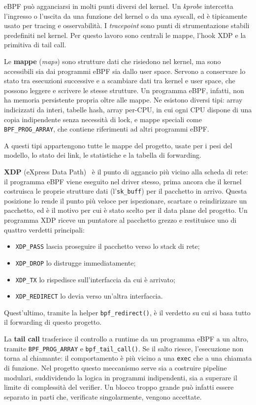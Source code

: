 \documentclass[binding=0.6cm,italian,oneside,noexaminfo]{sapthesis}
\begin{document}
eBPF può agganciarsi in molti punti diversi del kernel. Un \emph{kprobe} intercetta l'ingresso o l'uscita da una funzione del kernel o da una syscall, ed è tipicamente usato per tracing e osservabilità. I \emph{tracepoint} sono punti di strumentazione stabili predefiniti nel kernel. Per questo lavoro sono centrali le mappe, l'hook XDP e la primitiva di tail call.

Le \textbf{mappe} (\emph{maps}) sono strutture dati che risiedono nel kernel, ma sono accessibili sia dai programmi eBPF sia dallo user space. Servono a conservare lo stato tra esecuzioni successive e a scambiare dati tra kernel e user space, che possono leggere e scrivere le stesse strutture. Un programma eBPF, infatti, non ha memoria persistente propria oltre alle mappe. Ne esistono diversi tipi: array indicizzati da interi, tabelle hash, array per-CPU, in cui ogni CPU dispone di una copia indipendente senza necessità di lock, e mappe speciali come \texttt{BPF\_PROG\_ARRAY}, che contiene riferimenti ad altri programmi eBPF.

A questi tipi appartengono tutte le mappe del progetto, usate per i pesi del modello, lo stato dei link, le statistiche e la tabella di forwarding.

\textbf{XDP} (eXpress Data Path)~\cite{xdp2018} è il punto di aggancio più vicino alla scheda di rete: il programma eBPF viene eseguito nel driver stesso, prima ancora che il kernel costruisca le proprie strutture dati (l'\texttt{sk\_buff}) per il pacchetto in arrivo. Questa posizione lo rende il punto più veloce per ispezionare, scartare o reindirizzare un pacchetto, ed è il motivo per cui è stato scelto per il data plane del progetto. Un programma XDP riceve un puntatore al pacchetto grezzo e restituisce uno di quattro verdetti principali:
\begin{itemize}
    \item \texttt{XDP\_PASS} lascia proseguire il pacchetto verso lo stack di rete;
    \item \texttt{XDP\_DROP} lo distrugge immediatamente;
    \item \texttt{XDP\_TX} lo rispedisce sull'interfaccia da cui è arrivato;
    \item \texttt{XDP\_REDIRECT} lo devia verso un'altra interfaccia.
\end{itemize}

Quest'ultimo, tramite la helper \texttt{bpf\_redirect()}, è il verdetto su cui si basa tutto il forwarding di questo progetto.

La \textbf{tail call} trasferisce il controllo a runtime da un programma eBPF a un altro, tramite \texttt{BPF\_PROG\_ARRAY} e \texttt{bpf\_tail\_call()}. Se il salto riesce, l'esecuzione non torna al chiamante: il comportamento è più vicino a una \texttt{exec} che a una chiamata di funzione. Nel progetto questo meccanismo serve sia a costruire pipeline modulari, suddividendo la logica in programmi indipendenti, sia a superare il limite di complessità del verifier. Un blocco troppo grande può infatti essere separato in parti che, verificate singolarmente, vengono accettate.
\end{document}
